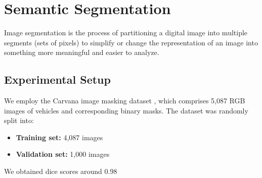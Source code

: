 \documentclass[conference]{IEEEtran}
\begin{document}
\begin{table}[!h]
\vspace*{1px}
\caption{Accuracy of FGSM and PGD attacks on EfficientNetB1 after applying defense techniques.}
\label{tab:combined_defense_results}
\end{table}


\section{Semantic Segmentation}
Image segmentation is the process of partitioning a digital image into multiple segments (sets of pixels) to simplify or change the representation of an image into something more meaningful and easier to analyze.
\subsection{Experimental Setup}
We employ the Carvana image masking dataset \cite{carvana2024}, which comprises 5,087 RGB images of vehicles and corresponding binary masks. The dataset was randomly split into:
\begin{itemize}
\item \textbf{Training set:} 4,087 images
\item \textbf{Validation set:} 1,000 images
\end{itemize}
We obtained dice scores around 0.98
\end{document}
